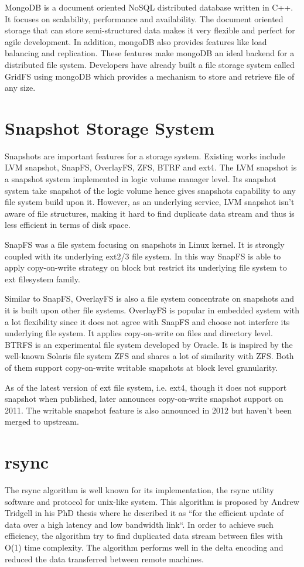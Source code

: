     MongoDB is a document oriented NoSQL distributed database written in C++. It focuses on scalability, performance and availability. The document oriented storage that can store semi-structured data makes it very flexible and perfect for agile development. In addition, mongoDB also provides features like load balancing and replication. These features make mongoDB an ideal backend for a distributed file system. Developers have already built a file storage system called GridFS using mongoDB which provides a mechanism to store and retrieve file of any size.

\section{Snapshot Storage System}

    Snapshots are important features for a storage system. Existing works include LVM snapshot, SnapFS, OverlayFS, ZFS, BTRF and ext4.
The LVM snapshot is a snapshot system implemented in logic volume manager level. Its snapshot system take snapshot of the logic volume hence gives snapshots capability to any file system build upon it. However, as an underlying service, LVM snapshot isn’t aware of file structures, making it hard to find duplicate data stream and thus is less efficient in terms of disk space.
    
    SnapFS was a file system focusing on snapshots in Linux kernel. It is strongly coupled with its underlying ext2/3 file system. In this way SnapFS is able to apply copy-on-write strategy on block but restrict its underlying file system to ext filesystem family. 
    
    Similar to SnapFS, OverlayFS is also a file system concentrate on snapshots and it is built upon other file systems. OverlayFS is popular in embedded system with a lot flexibility since it does not agree with SnapFS and choose not interfere its underlying file system. It applies copy-on-write on files and directory level.
BTRFS is an experimental file system developed by Oracle. It is inspired by the well-known Solaris file system ZFS and shares a lot of similarity with ZFS. Both of them support copy-on-write writable snapshots at block level granularity.
    
    As of the latest version of ext file system, i.e. ext4, though it does not support snapshot when published, later announces copy-on-write snapshot support on 2011. The writable snapshot feature is also announced in 2012 but haven’t been merged to upstream.

\section{rsync}
    
    The rsync algorithm is well known for its implementation, the rsync utility software and protocol for unix-like system. This algorithm is proposed by Andrew Tridgell in his PhD thesis where he described it as “for the efficient update of data over a high latency and low bandwidth link“. In order to achieve such efficiency, the algorithm try to find duplicated data stream between files with O(1) time complexity. The algorithm performs well in the delta encoding and reduced the data transferred between remote machines.